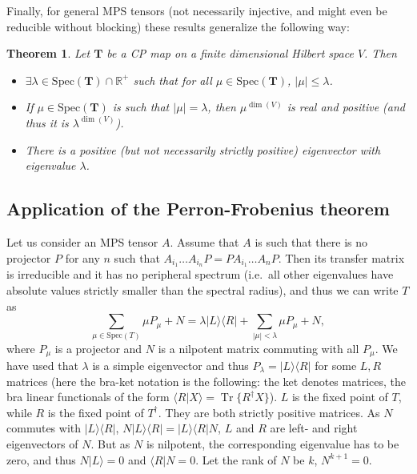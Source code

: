 \documentclass{article}
\newtheorem{theorem}{Theorem}
\newcommand{\tr}{\operatorname{Tr}}
\newcommand{\ket}[1]{\vert #1 \rangle}
\newcommand{\bra}[1]{\langle #1 \vert}
\newcommand{\scalprod}[2]{\langle #1 \vert #2 \rangle}
\begin{document}
Finally, for general MPS tensors (not necessarily injective, and might even be reducible without blocking) these results generalize the  following way:
\begin{theorem}
  Let $\mathbf{T}$ be a CP map on a finite dimensional Hilbert space $V$. Then 
  \begin{itemize}
  \item  $\exists \lambda\in \mathrm{Spec}(\mathbf{T})\cap \mathbb{R}^+$ such that for all $\mu\in \mathrm{Spec}(\mathbf{T})$, $|\mu|\leq \lambda$. 
  \item If $\mu\in \mathrm{Spec}(\mathbf{T})$ is such that $|\mu| =  \lambda$, then $\mu^{\dim(V)}$ is real and positive (and thus it is $\lambda^{\dim(V)}$).
  \item  There is a positive (but not necessarily strictly positive) eigenvector with eigenvalue $\lambda$. 
  \end{itemize}
\end{theorem}


\subsection{Application of the Perron-Frobenius theorem}
Let us consider an MPS tensor $A$. Assume that $A$ is such that there is no projector $P$ for any $n$ such that $A_{i_1} \dots A_{i_n} P = PA_{i_1} \dots A_n P$. Then its transfer matrix is irreducible and it has no peripheral spectrum (i.e.\ all other eigenvalues have absolute values strictly smaller than the spectral radius), and thus we can write $T$ as 
\begin{equation*}
  \sum_{\mu\in \mathrm{Spec}(T)} \mu P_{\mu} + N = \lambda \ket{L}\bra{R} + \sum_{|\mu|<\lambda} \mu P_\mu + N,
\end{equation*} 
where $P_\mu$ is a projector and $N$ is a nilpotent matrix commuting with all $P_\mu$. We have used that $\lambda$ is a simple eigenvector and thus $P_\lambda = \ket{L}\bra{R}$ for some $L,R$ matrices (here the bra-ket notation is the following: the ket denotes matrices, the bra linear functionals of the form $\scalprod{R}{X} = \tr\{R^\dagger X\}$). $L$ is the fixed point of $T$, while $R$ is the fixed point of $T^\dagger$. They are both strictly positive matrices. As $N$ commutes with $\ket{L}\bra{R}$, $N\ket{L} \bra{R} = \ket{L}\bra{R}N$, $L$ and $R$ are left- and right eigenvectors of $N$. But as $N$ is nilpotent, the corresponding eigenvalue has to be zero, and thus $N\ket{L} = 0$ and $\bra{R}N = 0$. Let the rank of $N$ be $k$, $N^{k+1} = 0$. 
\end{document}

